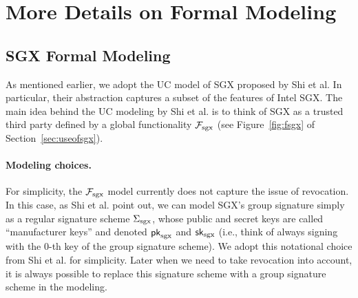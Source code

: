 


\newcommand{\ucstring}[1]{{\color{black} #1}}

\section{More Details on Formal Modeling} 
\subsection{SGX Formal Modeling}
\label{sec:sgxmodel}


As mentioned earlier, we adopt the 
UC model of SGX proposed by Shi et al.
In particular, their 
abstraction captures a subset of the features 
of Intel SGX. 
The main idea behind the UC modeling by Shi et al.
is to think of SGX 
as a trusted third party defined by 
a global functionality $\mathcal{F}_{\textrm{sgx}}$ (see Figure~\ref{fig:fsgx} of 
Section~\ref{sec:useofsgx}).

\paragraph{Modeling choices.}
For simplicity, the $\mathcal{F}_{\textrm{sgx}}$ model currently does not 
capture the issue of revocation.
In this case, as Shi et al. point out, 
we can model SGX's group signature
simply as a regular signature scheme ${\Sigma_{\textrm{sgx}}}$, whose
public and secret keys 
are called ``manufacturer keys'' and denoted ${\sf pk}_{\mathrm{sgx}}$ and ${\sf sk}_{\mathrm{sgx}}$ 
(i.e., think of always signing 
with the 0-th key of the group signature scheme).
We adopt this notational choice from Shi et al.  
for simplicity. Later when 
we need to take revocation into account,
it is always possible to replace this signature 
scheme with a group signature scheme in the modeling.

